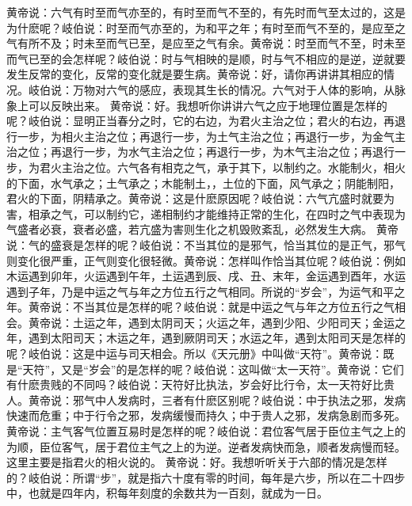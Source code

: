 \documentclass[a4paper,12pt,UTF8,twoside]{ctexbook}
\begin{document}
黄帝说：六气有时至而气亦至的，有时至而气不至的，有先时而气至太过的，这是为什麽呢？岐伯说：时至而气亦至的，为和平之年；有时至而气不至的，是应至之气有所不及；时未至而气已至，是应至之气有余。黄帝说：时至而气不至，时未至而气已至的会怎样呢？岐伯说：时与气相映的是顺，时与气不相应的是逆，逆就要发生反常的变化，反常的变化就是要生病。黄帝说：好，请你再讲讲其相应的情况。岐伯说：万物对六气的感应，表现其生长的情况。六气对于人体的影响，从脉象上可以反映出来。
黄帝说：好。我想听你讲讲六气之应于地理位置是怎样的呢？岐伯说：显明正当春分之时，它的右边，为君火主治之位；君火的右边，再退行一步，为相火主治之位；再退行一步，为土气主治之位；再退行一步，为金气主治之位；再退行一步，为水气主治之位；再退行一步，为木气主治之位；再退行一步，为君火主治之位。六气各有相克之气，承于其下，以制约之。水能制火，相火的下面，水气承之；土气承之；木能制土，，土位的下面，风气承之；阴能制阳，君火的下面，阴精承之。黄帝说：这是什麽原因呢？岐伯说：六气亢盛时就要为害，相承之气，可以制约它，递相制约才能维持正常的生化，在四时之气中表现为气盛者必衰，衰者必盛，若亢盛为害则生化之机毁败紊乱，必然发生大病。
黄帝说：气的盛衰是怎样的呢？岐伯说：不当其位的是邪气，恰当其位的是正气，邪气则变化很严重，正气则变化很轻微。黄帝说：怎样叫作恰当其位呢？岐伯说：例如木运遇到卯年，火运遇到午年，土运遇到辰、戌、丑、末年，金运遇到酉年，水运遇到子年，乃是中运之气与年之方位五行之气相同。所说的“岁会”，为运气和平之年。黄帝说：不当其位是怎样的呢？岐伯说：就是中运之气与年之方位五行之气相会。黄帝说：土运之年，遇到太阴司天；火运之年，遇到少阳、少阳司天；金运之年，遇到太阳司天；木运之年，遇到厥阴司天；水运之年，遇到太阳司天是怎样的呢？岐伯说：这是中运与司天相会。所以《天元册》中叫做“天符”。黄帝说：既是“天符”，又是“岁会”的是怎样的呢？岐伯说：这叫做“太一天符”。黄帝说：它们有什麽贵贱的不同吗？岐伯说：天符好比执法，岁会好比行令，太一天符好比贵人。黄帝说：邪气中人发病时，三者有什麽区别呢？岐伯说：中于执法之邪，发病快速而危重；中于行令之邪，发病缓慢而持久；中于贵人之邪，发病急剧而多死。黄帝说：主气客气位置互易时是怎样的呢？岐伯说：君位客气居于臣位主气之上的为顺，臣位客气，居于君位主气之上的为逆。逆者发病快而急，顺者发病慢而轻。这里主要是指君火的相火说的。
黄帝说：好。我想听听关于六部的情况是怎样的？岐伯说：所谓“步”，就是指六十度有零的时间，每年是六步，所以在二十四步中，也就是四年内，积每年刻度的余数共为一百刻，就成为一日。
\end{document}
